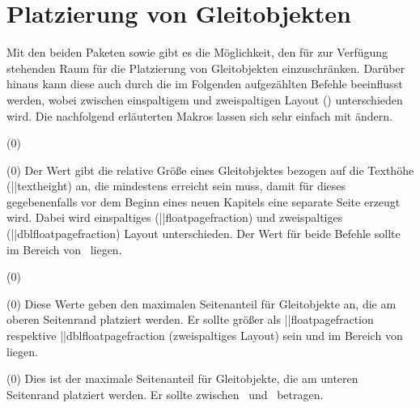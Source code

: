 \section{%
  Platzierung von Gleitobjekten%
  \label{sec:tips:floats}%
}
%
\begin{Entity}{}
Mit den beiden Paketen  sowie  gibt es die 
Möglichkeit, den für  zur Verfügung stehenden Raum für die 
Platzierung von Gleitobjekten einzuschränken. Darüber hinaus kann diese auch 
durch die im Folgenden aufgezählten Befehle beeinflusst werden, wobei zwischen 
einspaltigem und zweispaltigen Layout () unterschieden wird. 
Die nachfolgend erläuterten Makros lassen sich sehr einfach mit 
 ändern. 

\begin{Declaration}
  {}
  (0\floatpagefraction)
\begin{Declaration}
  {}
  (0\dblfloatpagefraction)
\printdeclarationlist
%
Der Wert gibt die relative Größe eines Gleitobjektes bezogen auf die Texthöhe 
(\Length||{textheight}) an, die mindestens erreicht sein muss, damit für dieses 
gegebenenfalls vor dem Beginn eines neuen Kapitels eine separate Seite erzeugt 
wird. Dabei wird einspaltiges (\Macro||{floatpagefraction}) und zweispaltiges 
(\Macro||{dblfloatpagefraction}) Layout unterschieden. Der Wert für beide 
Befehle sollte im Bereich von~ liegen.
\end{Declaration}
\end{Declaration}

\begin{Declaration}
  {}
  (0\topfraction)
\begin{Declaration}
  {}
  (0\dbltopfraction)
\printdeclarationlist
%
Diese Werte geben den maximalen Seitenanteil für Gleitobjekte an, die am oberen 
Seitenrand platziert werden. Er sollte größer als \Macro||{floatpagefraction} 
respektive \Macro||{dblfloatpagefraction} (zweispaltiges Layout) sein und im 
Bereich von  liegen. 
\end{Declaration}
\end{Declaration}

\begin{Declaration}
  {}
  (0\bottomfraction)
\printdeclarationlist
%
Dies ist der maximale Seitenanteil für Gleitobjekte, die am unteren Seitenrand 
platziert werden. Er sollte zwischen~ und~ betragen.
\end{Declaration}


\end{Entity}
